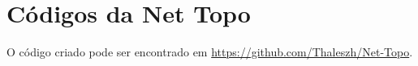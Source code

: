 \chapter{Códigos da Net Topo}
\label{apd:net_topo}

O código criado pode ser encontrado em \href{https://github.com/Thaleszh/Net-Topo}{https://github.com/Thaleszh/Net-Topo}.

